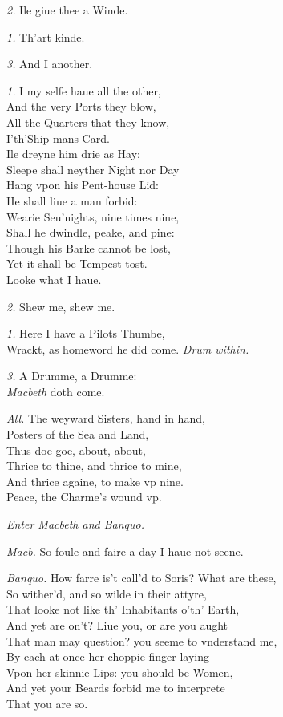 \documentclass[12pt]{sides}
\newcommand{\dia}[1]{\hskip 15pt\textit{#1}\hskip 6pt}
\newcommand{\cstagedir}[1]{%
  \vspace{6pt}%
  \centerline{\textit{#1}}%
  \vspace{12pt}%
}
\begin{document}
\begin{multicols}{2}
			\dia{2.} Ile giue thee a Winde.
			
			\dia{1.} Th'art kinde.
			
			\dia{3.} And I another.
			
			\dia{1.} I my selfe haue all the other, \\ And the very Ports they blow, \\ All the Quarters that they know, \\ I'th'Ship-mans Card. \\  Ile dreyne him drie as Hay: \\ Sleepe shall neyther Night nor Day \\ Hang vpon his Pent-house Lid: \\ He shall liue a man forbid: \\ Wearie Seu'nights, nine times nine, \\ Shall he dwindle, peake, and pine: \\ Though his Barke cannot be lost, \\ Yet it shall be Tempest-tost. \\ Looke what I haue.
            
            \dia{2.} Shew me, shew me.

            \dia{1.} Here I have a Pilots Thumbe, \\ Wrackt, as homeword he did come. \hfill\textit{Drum within.}
            
            \dia{3.} A Drumme, a Drumme: \\ \textit{Macbeth} doth come.

            \dia{All.} The weyward Sisters, hand in hand, \\ Posters of the Sea and Land, \\ Thus doe goe, about, about, \\ Thrice to thine, and thrice to mine, \\ And thrice againe, to make vp nine. \\ Peace, the Charme's wound vp.

            \cstagedir{Enter Macbeth and Banquo.}

            \dia{Macb.} So foule and faire a day I haue not seene.
            
            \dia{Banquo.} How farre is't call'd to Soris? What are these, \\ So wither'd, and so wilde in their attyre, \\ That looke not like th' Inhabitants o'th' Earth, \\ And yet are on't? Liue you, or are you aught \\ That man may question? you seeme to vnderstand me, \\ By each at once her choppie finger laying \\ Vpon her skinnie Lips: you should be Women, \\ And yet your Beards forbid me to interprete \\ That you are so.


\end{multicols}
\end{document}
